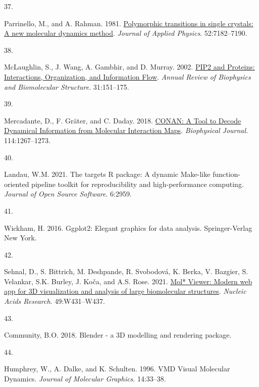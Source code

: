 \documentclass[
  twocolumn]{biophys-new-mod}
\newlength{\cslhangindent}
\newlength{\csllabelwidth}
\newlength{\cslentryspacingunit} %
\newenvironment{CSLReferences}[2] %
 {%
  \setlength{\parindent}{0pt}
  \ifodd #1
  \let\oldpar\par
  \def\par{\hangindent=\cslhangindent\oldpar}
  \fi
  \setlength{\parskip}{#2\cslentryspacingunit}
 }%
 {}
\newcommand{\CSLLeftMargin}[1]{\parbox[t]{\csllabelwidth}{#1}}
\newcommand{\CSLRightInline}[1]{\parbox[t]{\linewidth - \csllabelwidth}{#1}\break}
\begin{document}
\begin{CSLReferences}{0}{0}
\leavevmode{}%
\CSLLeftMargin{37. }%
\CSLRightInline{Parrinello, M., and A. Rahman. 1981.
\href{https://doi.org/10.1063/1.328693}{Polymorphic transitions in
single crystals: {A} new molecular dynamics method}. \emph{Journal of
Applied Physics}. 52:7182--7190.}

\leavevmode{}%
\CSLLeftMargin{38. }%
\CSLRightInline{McLaughlin, S., J. Wang, A. Gambhir, and D. Murray.
2002.
\href{https://doi.org/10.1146/annurev.biophys.31.082901.134259}{{PIP2}
and {Proteins}: {Interactions}, {Organization}, and {Information Flow}}.
\emph{Annual Review of Biophysics and Biomolecular Structure}.
31:151--175.}

\leavevmode{}%
\CSLLeftMargin{39. }%
\CSLRightInline{Mercadante, D., F. Gräter, and C. Daday. 2018.
\href{https://doi.org/10.1016/j.bpj.2018.01.033}{{CONAN}: {A Tool} to
{Decode Dynamical Information} from {Molecular Interaction Maps}}.
\emph{Biophysical Journal}. 114:1267--1273.}

\leavevmode{}%
\CSLLeftMargin{40. }%
\CSLRightInline{Landau, W.M. 2021. The targets {R} package: A dynamic
{Make-like} function-oriented pipeline toolkit for reproducibility and
high-performance computing. \emph{Journal of Open Source Software}.
6:2959.}

\leavevmode{}%
\CSLLeftMargin{41. }%
\CSLRightInline{Wickham, H. 2016. Ggplot2: {Elegant} graphics for data
analysis. {Springer-Verlag New York}.}

\leavevmode{}%
\CSLLeftMargin{42. }%
\CSLRightInline{Sehnal, D., S. Bittrich, M. Deshpande, R. Svobodová, K.
Berka, V. Bazgier, S. Velankar, S.K. Burley, J. Koča, and A.S. Rose.
2021. \href{https://doi.org/10.1093/nar/gkab314}{Mol* {Viewer}: Modern
web app for {3D} visualization and analysis of large biomolecular
structures}. \emph{Nucleic Acids Research}. 49:W431--W437.}

\leavevmode{}%
\CSLLeftMargin{43. }%
\CSLRightInline{Community, B.O. 2018. Blender - a {3D} modelling and
rendering package.}

\leavevmode{}%
\CSLLeftMargin{44. }%
\CSLRightInline{Humphrey, W., A. Dalke, and K. Schulten. 1996. {VMD}
\textendash{} {Visual Molecular Dynamics}. \emph{Journal of Molecular
Graphics}. 14:33--38.}


\end{CSLReferences}
\end{document}
